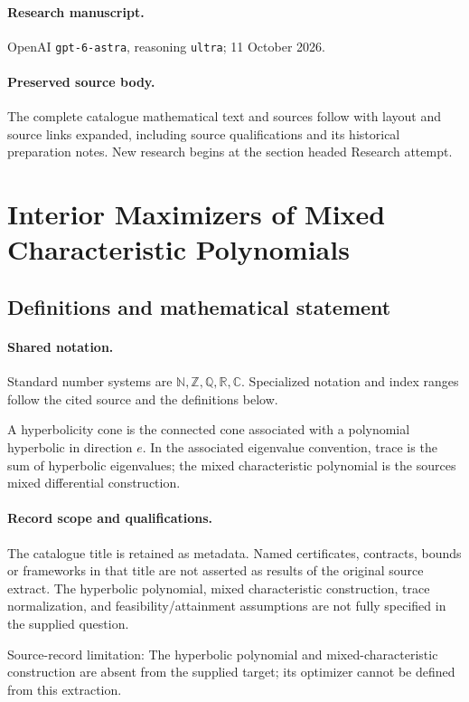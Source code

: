 \documentclass[11pt]{article}
\begin{document}
\paragraph{Research manuscript.} OpenAI \texttt{gpt-6-astra}, reasoning \texttt{ultra}; 11 October 2026.
\paragraph{Preserved source body.} The complete catalogue mathematical text and sources follow with layout and source links expanded, including source qualifications and its historical preparation notes. New research begins at the section headed Research attempt.

\section{Interior Maximizers of Mixed Characteristic Polynomials}\label{statement}

\subsection{Definitions and mathematical statement}

\paragraph{Shared notation.}Standard number systems are $\mathbb N,\mathbb Z,\mathbb Q,\mathbb R,\mathbb C$. Specialized notation and index ranges follow the cited source and the definitions below.


A hyperbolicity cone is the connected cone associated with a polynomial hyperbolic in direction $e$. In the associated eigenvalue convention, trace is the sum of hyperbolic eigenvalues; the mixed characteristic polynomial is the source\textquotesingle s mixed differential construction.
\paragraph{Record scope and qualifications.}
The catalogue title is retained as metadata. Named certificates, contracts, bounds or frameworks in that title are not asserted as results of the original source extract.
The hyperbolic polynomial, mixed characteristic construction, trace normalization, and feasibility/attainment assumptions are not fully specified in the supplied question.

Source-record limitation: The hyperbolic polynomial and mixed-characteristic construction are absent from the supplied target; its optimizer cannot be defined from this extraction.
\end{document}
